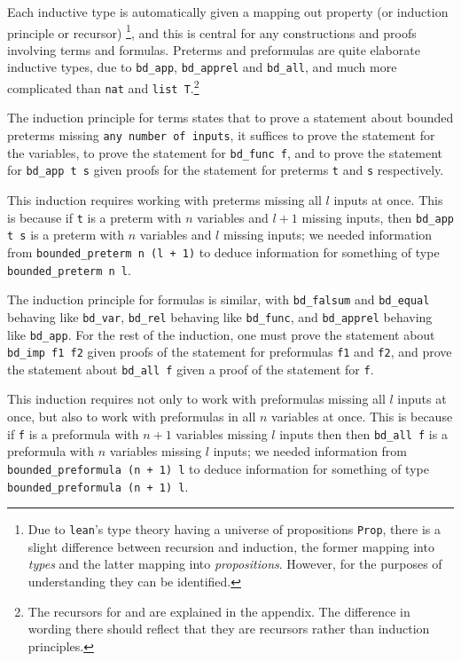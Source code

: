 \begin{rmk}
  Each inductive type is automatically given a mapping out property (or induction principle or recursor)
  \footnote{
    Due to \texttt{lean}'s type theory having a universe of propositions \texttt{Prop},
    there is a slight difference between recursion and induction,
    the former mapping into \textit{types} and the latter mapping into \textit{propositions}.
    However, for the purposes of understanding they can be identified.
  },
  and this is central for any constructions and proofs involving terms and formulas.
  Preterms and preformulas are quite elaborate inductive types,
  due to \texttt{bd\_app}, \texttt{bd\_apprel} and \texttt{bd\_all},
  and much more complicated than \texttt{nat} and \texttt{list T}.\footnote{
    The recursors for  and 
    are explained in the appendix.
    The difference in wording there should reflect that they are recursors
    rather than induction principles.
  }

  The induction principle for terms states that to prove a statement about
  bounded preterms missing \texttt{any number of inputs},
  it suffices to prove the statement for the variables,
  to prove the statement for \texttt{bd\_func f},
  and to prove the statement for \texttt{bd\_app t s} given proofs for the statement
  for preterms \texttt{t} and \texttt{s} respectively.

  This induction requires working with preterms missing all $l$ inputs at once.
  This is because if \texttt{t} is a preterm with $n$ variables and $l + 1$ missing inputs,
  then \texttt{bd\_app t s} is a preterm with $n$ variables and $l$ missing inputs;
  we needed information from \texttt{bounded\_preterm n (l + 1)} to deduce
  information for something of type \texttt{bounded\_preterm n l}.

  The induction principle for formulas is similar,
  with \texttt{bd\_falsum} and \texttt{bd\_equal} behaving like \texttt{bd\_var},
  \texttt{bd\_rel} behaving like \texttt{bd\_func},
  and \texttt{bd\_apprel} behaving like \texttt{bd\_app}.
  For the rest of the induction,
  one must prove the statement about \texttt{bd\_imp f1 f2} given
  proofs of the statement for preformulas \texttt{f1} and \texttt{f2},
  and prove the statement about \texttt{bd\_all f} given a proof
  of the statement for \texttt{f}.

  This induction requires not only to work with preformulas missing all $l$ inputs at once,
  but also to work with preformulas in all $n$ variables at once.
  This is because if \texttt{f} is a preformula with $n + 1$ variables missing $l$ inputs then
  then \texttt{bd\_all f} is a preformula with $n$ variables missing $l$ inputs;
  we needed information from \texttt{bounded\_preformula (n + 1) l} to deduce information
  for something of type \texttt{bounded\_preformula (n + 1) l}.

\end{rmk}

